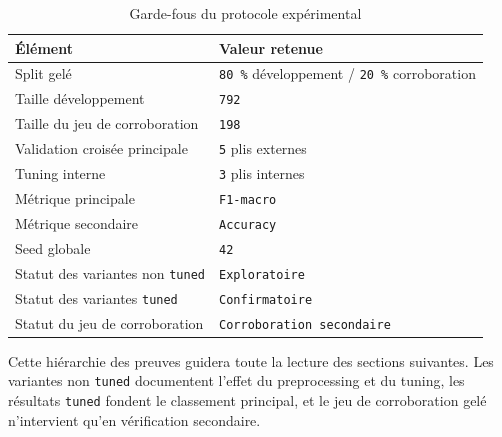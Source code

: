 \begin{table}[H]
\centering
\begin{tabular}{|l|l|}
\hline
\textbf{Élément} & \textbf{Valeur retenue} \\
\hline
Split gelé & \texttt{80 \%} développement / \texttt{20 \%} corroboration \\
Taille développement & \texttt{792} \\
Taille du jeu de corroboration & \texttt{198} \\
Validation croisée principale & \texttt{5} plis externes \\
Tuning interne & \texttt{3} plis internes \\
Métrique principale & \texttt{F1-macro} \\
Métrique secondaire & \texttt{Accuracy} \\
Seed globale & \texttt{42} \\
Statut des variantes non \texttt{tuned} & \texttt{Exploratoire} \\
Statut des variantes \texttt{tuned} & \texttt{Confirmatoire} \\
Statut du jeu de corroboration & \texttt{Corroboration secondaire} \\
\hline
\end{tabular}
\caption{Garde-fous du protocole expérimental}
\end{table}

Cette hiérarchie des preuves guidera toute la lecture des sections suivantes. Les variantes non \texttt{tuned} documentent l'effet du preprocessing et du tuning, les résultats \texttt{tuned} fondent le classement principal, et le jeu de corroboration gelé n'intervient qu'en vérification secondaire.

